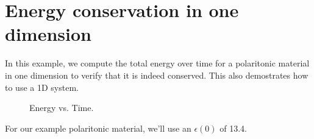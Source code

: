 \begin{comment}
#include <stdio.h>
#include <stdlib.h>
#include <signal.h>
\end{comment}

\section{Energy conservation in one dimension}

In this example, we compute the total energy over time for a polaritonic
material in one dimension to verify that it is indeed conserved.  This also
demostrates how to use a 1D system.

\begin{figure}
\label{econs_1d}
\caption{Energy vs. Time.}
\end{figure}

\begin{comment}
#include "dactyl.h"

const int a = 10;
\end{comment}

For our example polaritonic material, we'll use an $\epsilon(0)$ of 13.4.

